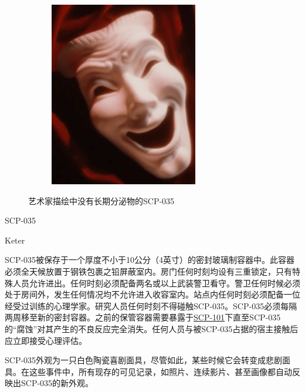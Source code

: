 \begin{figure}[H]
\begin{subfigure}[b]{0.4\textwidth}
        \includegraphics[width=\linewidth]{images/SCP-035-1.png}
    \end{subfigure}
    \caption*{艺术家描绘中没有长期分泌物的SCP-035}
\end{figure}

SCP-035

Keter

SCP-035被保存于一个厚度不小于10公分（4英寸）的密封玻璃制容器中。此容器必须全天候放置于钢铁包裹之铅屏蔽室内。房门任何时刻均设有三重锁定，只有特殊人员允许进出。任何时刻必须配备两名或以上武装警卫看守。警卫任何时候必须处于房间外，发生任何情况均不允许进入收容室内。站点内任何时刻必须配备一位经受过训练的心理学家。研究人员任何时刻不得碰触SCP-035。SCP-035必须每隔两周移至新的密封容器。之前的保管容器需要暴露于\hyperref[chap:SCP-101]{SCP-101}下直至SCP-035的“腐蚀”对其产生的不良反应完全消失。任何人员与被SCP-035占据的宿主接触后应立即接受心理评估。

SCP-035外观为一只白色陶瓷喜剧面具，尽管如此，某些时候它会转变成悲剧面具。在这些事件中，所有现存的可见记录，如照片、连续影片、甚至画像都自动反映出SCP-035的新外观。

